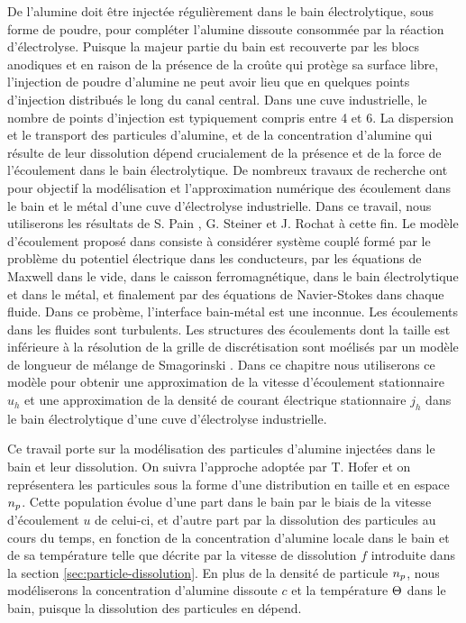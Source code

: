 De l'alumine doit être injectée régulièrement dans le bain
électrolytique, sous forme de poudre, pour compléter l'alumine
dissoute consommée par la réaction d'électrolyse. Puisque la majeur
partie du bain est recouverte par les blocs anodiques et en raison de
la présence de la croûte qui protège sa surface libre, l'injection de
poudre d'alumine ne peut avoir lieu que en quelques points d'injection
distribués le long du canal central. Dans une cuve industrielle, le
nombre de points d'injection est typiquement compris entre 4 et 6. La
dispersion et le transport des particules d'alumine, et de la
concentration d'alumine qui résulte de leur dissolution dépend
crucialement de la présence et de la force de l'écoulement dans le
bain électrolytique. De nombreux travaux de recherche ont pour
objectif la modélisation et l'approximation numérique des écoulement
dans le bain et le métal d'une cuve d'électrolyse industrielle. Dans
ce travail, nous utiliserons les résultats de S. Pain \cite{Pain2006},
G. Steiner \cite{Steiner2009} et J. Rochat \cite{Rochat2016} à cette
fin. Le modèle d'écoulement proposé dans \cite{Steiner2009} consiste à
considérer système couplé formé par le problème du potentiel
électrique dans les conducteurs, par les équations de Maxwell dans le
vide, dans le caisson ferromagnétique, dans le bain électrolytique et
dans le métal, et finalement par des équations de Navier-Stokes dans
chaque fluide. Dans ce probème, l'interface bain-métal est une
inconnue. Les écoulements dans les fluides sont turbulents. Les
structures des écoulements dont la taille est inférieure à la
résolution de la grille de discrétisation sont moélisés par un modèle
de longueur de mélange de Smagorinski \cite{Rochat2016}. Dans ce
chapitre nous utiliserons ce modèle pour obtenir une approximation de
la vitesse d'écoulement stationnaire $u_h$ et une approximation de la
densité de courant électrique stationnaire $j_h$ dans le bain
électrolytique d'une cuve d'électrolyse industrielle.

Ce travail porte sur la modélisation des particules d'alumine
injectées dans le bain et leur dissolution. On suivra l'approche
adoptée par T. Hofer \cite{Hofer2011} et on représentera les
particules sous la forme d'une distribution en taille et en espace
$n_p$. Cette population évolue d'une part dans le bain par
le biais de la vitesse d'écoulement $u$ de celui-ci, et d'autre part par
la dissolution des particules au cours du temps, en fonction de la
concentration d'alumine locale dans le bain et de sa température telle
que décrite par la vitesse de dissolution $f$ introduite dans la
section \ref{sec:particle-dissolution}. En plus de la densité de
particule $n_p$, nous modéliserons la concentration d'alumine
dissoute $c$ et la température $\Theta$ dans le bain, puisque
la dissolution des particules en dépend.

